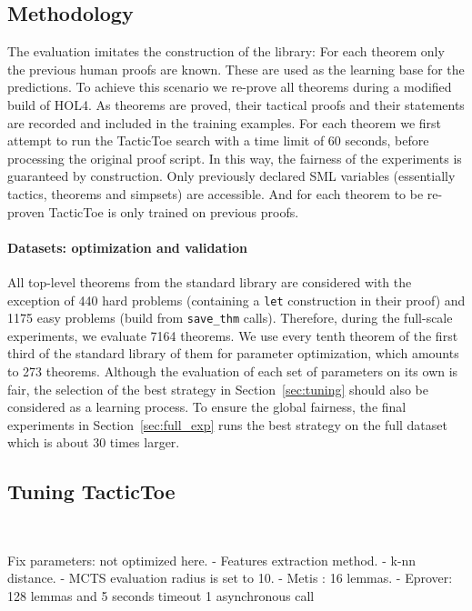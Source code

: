 \documentclass[runningheads,a4paper,draft]{svjour3}
\newcommand{\todoi}[1]{\todo[inline]{#1}}
\def\holfour{\textsf{HOL4}\xspace}
\def\sml{\textsf{SML}\xspace}
\def\tactictoe{\textsf{TacticToe}\xspace}
\begin{document}
\subsection{Methodology}
The evaluation imitates the construction of the library: For each theorem only
the previous human proofs are known. These are used as the learning base for
the predictions.
To achieve this scenario we re-prove all theorems during a modified build of
\holfour.
As theorems are proved, their tactical proofs and their statements are
recorded and included in the training examples.
For each theorem we first attempt to run the \tactictoe search with a time
limit of 60 seconds, before processing the original proof script.
In this way, the fairness of the experiments is guaranteed by construction.
Only previously declared \sml
variables (essentially tactics, theorems and simpsets) are accessible.
And for each theorem to be re-proven \tactictoe is only trained on previous
proofs.

\todoi{rephrase to something more coherent}
\paragraph{Datasets: optimization and validation}

All top-level theorems from the standard library are considered with the
exception of 440 hard problems (containing a \texttt{let} construction in their
proof) and 1175 easy problems (build from \texttt{save\_thm} calls).
Therefore, during the full-scale experiments, we evaluate 7164 theorems.
We use every tenth theorem of the first third of the standard library of
them for parameter optimization, which amounts to 273 theorems.
Although the evaluation of each set of parameters on its own is fair,
the selection of the best strategy in Section~\ref{sec:tuning} should also be
considered as a learning process. To ensure the global fairness, the final
experiments in Section~\ref{sec:full_exp} runs the best strategy on the full
dataset which is about 30 times larger.

\subsection{Tuning \tactictoe}~\label{sec:tuning}

Fix parameters: not optimized here.
 - Features extraction method.
 - k-nn distance.
 - MCTS evaluation radius is set to 10.
 - Metis : 16 lemmas.
 - Eprover: 128 lemmas and 5 seconds timeout 1 asynchronous call
\end{document}
